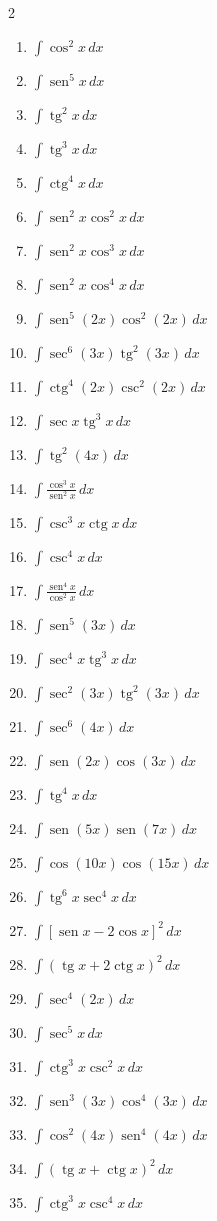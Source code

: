 \documentclass[12pt, letterpaper]{article}
\newcommand{\dx}{\,dx}
\DeclareMathOperator{\sen}{sen}
\DeclareMathOperator{\tg}{tg}
\DeclareMathOperator{\ctg}{ctg}
\begin{document}
\begin{multicols}{2}
\begin{enumerate}[leftmargin=*]
  \item \facil{} $\int \cos^2 x \dx$
  \item \facil{} $\int \sen^5 x \dx$
  \item \facil{} $\int \tg^2 x \dx$
  \item \facil{} $\int \tg^3 x \dx$
  \item \facil{} $\int \ctg^4 x \dx$
  \item \medio{} $\int \sen^2 x \cos^2 x \dx$
  \item \medio{} $\int \sen^2 x \cos^3 x \dx$
  \item \medio{} $\int \sen^2 x \cos^4 x \dx$
  \item \medio{} $\int \sen^5(2x)\cos^2(2x) \dx$
  \item \medio{} $\int \sec^6(3x)\tg^2(3x) \dx$
  \item \medio{} $\int \ctg^4(2x)\csc^2(2x) \dx$
  \item \medio{} $\int \sec x \tg^3 x \dx$
  \item \facil{} $\int \tg^2(4x) \dx$
  \item \medio{} $\int \frac{\cos^3 x}{\sen^2 x} \dx$
  \item \medio{} $\int \csc^3 x \ctg x \dx$
  \item \medio{} $\int \csc^4 x \dx$
  \item \dificil{} $\int \frac{\sen^4 x}{\cos^2 x} \dx$
  \item \medio{} $\int \sen^5(3x) \dx$
  \item \medio{} $\int \sec^4 x \tg^3 x \dx$
  \item \facil{} $\int \sec^2(3x)\tg^2(3x) \dx$
  \item \medio{} $\int \sec^6(4x) \dx$
  \item \medio{} $\int \sen(2x)\cos(3x) \dx$
  \item \medio{} $\int \tg^4 x \dx$
  \item \medio{} $\int \sen(5x)\sen(7x) \dx$
  \item \medio{} $\int \cos(10x)\cos(15x) \dx$
  \item \dificil{} $\int \tg^6 x \sec^4 x \dx$
  \item \medio{} $\int [\sen x - 2\cos x]^2 \dx$
  \item \medio{} $\int (\tg x + 2\ctg x)^2 \dx$
  \item \facil{} $\int \sec^4(2x) \dx$
  \item \dificil{} $\int \sec^5 x \dx$
  \item \facil{} $\int \ctg^3 x \csc^2 x \dx$
  \item \medio{} $\int \sen^3(3x)\cos^4(3x) \dx$
  \item \dificil{} $\int \cos^2(4x)\sen^4(4x) \dx$
  \item \facil{} $\int (\tg x + \ctg x)^2 \dx$
  \item \dificil{} $\int \ctg^3 x \csc^4 x \dx$
\end{enumerate}
\end{multicols}
\end{document}
